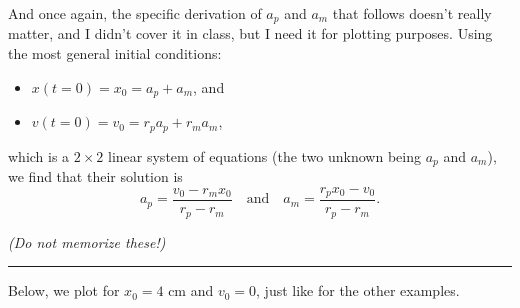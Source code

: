 \documentclass[11pt]{article}
\providecommand{\tightlist}{%
      \setlength{\itemsep}{0pt}\setlength{\parskip}{0pt}}
\begin{document}
And once again, the specific derivation of \(a_p\) and \(a_m\) that
follows doesn't really matter, and I didn't cover it in class, but I
need it for plotting purposes. Using the most general initial
conditions:

\begin{itemize}
\tightlist
\item
  \(x(t=0) = x_0 = a_p + a_m\), and
\item
  \(v(t=0) = v_0 = r_p a_p + r_m a_m\),
\end{itemize}

which is a \(2\times 2\) linear system of equations (the two unknown
being \(a_p\) and \(a_m\)), we find that their solution is
\[a_p = \frac{v_0-r_mx_0}{r_p - r_m}\quad \textrm{and}\quad a_m = \frac{r_px_0 - v_0}{r_p - r_m}. \]

\emph{(Do not memorize these!)}

\begin{center}\rule{0.5\linewidth}{\linethickness}\end{center}

Below, we plot for \(x_0 = 4\) cm and \(v_0 = 0\), just like for the
other examples.
\end{document}
